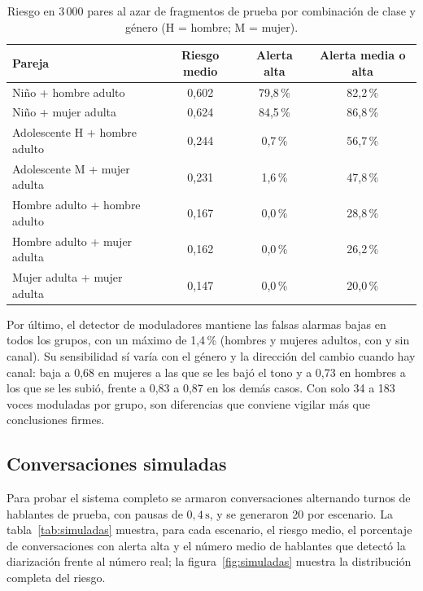 \documentclass[11pt,a4paper]{article}
\begin{document}
\begin{table}[H]
\centering
\caption{Riesgo en 3\,000 pares al azar de fragmentos de prueba por combinación de clase y género (H = hombre; M = mujer).}
\label{tab:genero_riesgo}
\small
\begin{tabular}{@{}lccc@{}}
\toprule
\textbf{Pareja} & \textbf{Riesgo medio} & \textbf{Alerta alta} & \textbf{Alerta media o alta} \\
\midrule
Niño + hombre adulto          & 0,602 & 79,8\,\% & 82,2\,\% \\
Niño + mujer adulta           & 0,624 & 84,5\,\% & 86,8\,\% \\
Adolescente H + hombre adulto & 0,244 & 0,7\,\%  & 56,7\,\% \\
Adolescente M + mujer adulta  & 0,231 & 1,6\,\%  & 47,8\,\% \\
Hombre adulto + hombre adulto & 0,167 & 0,0\,\%  & 28,8\,\% \\
Hombre adulto + mujer adulta  & 0,162 & 0,0\,\%  & 26,2\,\% \\
Mujer adulta + mujer adulta   & 0,147 & 0,0\,\%  & 20,0\,\% \\
\bottomrule
\end{tabular}
\end{table}

Por último, el detector de moduladores mantiene las falsas alarmas bajas en todos los grupos, con un máximo de 1,4\,\% (hombres y mujeres adultos, con y sin canal). Su sensibilidad sí varía con el género y la dirección del cambio cuando hay canal: baja a 0,68 en mujeres a las que se les bajó el tono y a 0,73 en hombres a los que se les subió, frente a 0,83 a 0,87 en los demás casos. Con solo 34 a 183 voces moduladas por grupo, son diferencias que conviene vigilar más que conclusiones firmes.

\subsection{Conversaciones simuladas}

Para probar el sistema completo se armaron conversaciones alternando turnos de hablantes de prueba, con pausas de $0{,}4\,\mathrm{s}$, y se generaron 20 por escenario. La tabla~\ref{tab:simuladas} muestra, para cada escenario, el riesgo medio, el porcentaje de conversaciones con alerta alta y el número medio de hablantes que detectó la diarización frente al número real; la figura~\ref{fig:simuladas} muestra la distribución completa del riesgo.
\end{document}
